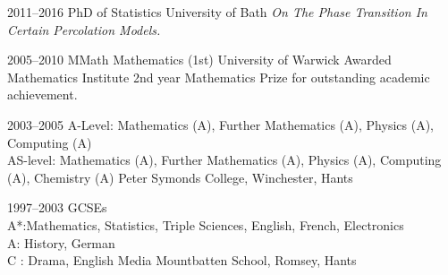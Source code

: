 \documentclass[print, oneside]{friggeri-cv} %
\begin{document}
\begin{entrylist}
\entry
{2011--2016}
{PhD {\normalfont of Statistics}}
{University of Bath}
{\emph{On The Phase Transition In Certain Percolation Models.}}


\entry
{2005--2010}
{MMath Mathematics {\normalfont(1st)}}
{University of Warwick}
{Awarded Mathematics Institute 2nd year Mathematics Prize for outstanding academic achievement.}


\entry
{2003--2005}
{A-Level{\normalfont : Mathematics (A), Further Mathematics (A), Physics (A), Computing (A) }\\ 
AS-level{\normalfont : Mathematics (A), Further Mathematics (A), Physics (A), Computing (A), Chemistry (A)}}
{Peter Symonds College, Winchester, Hants}
{}


\entry
{1997--2003}
{GCSEs\\
{A*{\normalfont :Mathematics, Statistics, Triple Sciences, English, French, Electronics\\}
A{\normalfont : History, German\\}
C \normalfont : Drama, English Media}}
{Mountbatten School, Romsey, Hants}{}

%
%
%
%

\end{entrylist}

\pagebreak
\end{document}
